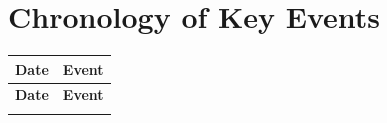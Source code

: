 \section{Chronology of Key Events}
\label{sec:timeline}

\begin{longtable}{p{3cm}p{9.5cm}}
\toprule
\textbf{Date} & \textbf{Event} \\
\midrule
\endfirsthead
\toprule
\textbf{Date} & \textbf{Event} \\
\midrule
\endhead
\bottomrule
\endfoot
\end{longtable}
